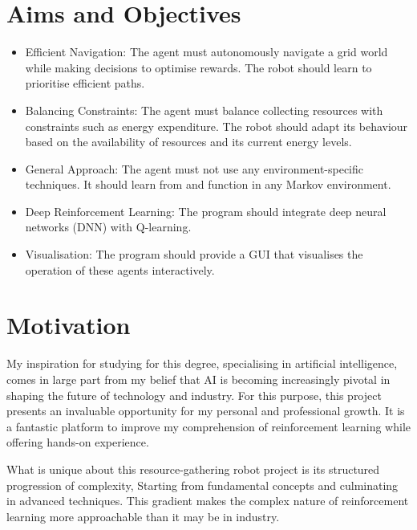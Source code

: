 \documentclass[]{final_report}
\begin{document}

\section{Aims and Objectives}


\begin{itemize}
  \item Efficient Navigation: The agent must autonomously navigate a grid world while making decisions to optimise rewards. The robot should learn to prioritise efficient paths.
  \item Balancing Constraints: The agent must balance collecting resources with constraints such as energy expenditure. The robot should adapt its behaviour based on the availability of resources and its current energy levels.
  \item General Approach: The agent must not use any environment-specific techniques. It should learn from and function in any Markov environment.
  \item Deep Reinforcement Learning: The program should integrate deep neural networks (DNN) with Q-learning.
  \item Visualisation: The program should provide a GUI that visualises the operation of these agents interactively.
\end{itemize}


\section{Motivation}

My inspiration for studying for this degree, specialising in artificial intelligence, comes in large part from my belief that AI is becoming increasingly pivotal in shaping the future of technology and industry. For this purpose, this project presents an invaluable opportunity for my personal and professional growth. It is a fantastic platform to improve my comprehension of reinforcement learning while offering hands-on experience. 

What is unique about this resource-gathering robot project is its structured progression of complexity, Starting from fundamental concepts and culminating in advanced techniques. This gradient makes the complex nature of reinforcement learning more approachable than it may be in industry. 
\end{document}
